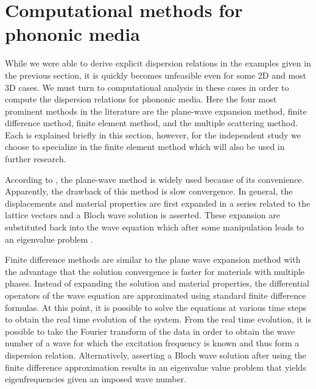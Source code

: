 \documentclass{article}
\begin{document}
\section{Computational methods for phononic media} \label{methods}
While we were able to derive explicit dispersion relations in the examples 
given in the previous section, it is quickly becomes unfeasible even for some 
2D and most 3D cases. We must turn to computational analysis in these cases in 
order to compute the dispersion relations for phononic media. Here the 
four most prominent methods in the literature are the plane-wave expansion 
method, finite difference method, finite element method, and the multiple 
scattering method. Each is explained briefly in this section, however, for the 
independent study we choose to specialize in the finite element method which 
will also be used in further research.

According to \cite{cao04}, the plane-wave method is widely used because of its 
convenience. Apparently, the drawback of this method is slow convergence. In 
general, the displacements and material properties are first expanded in a 
series related to the lattice vectors and a Bloch wave solution is asserted. 
These expansion are substituted back into the wave equation which after some 
manipulation leads to an eigenvalue problem \cite{hussein14}.

Finite difference methods are similar to the plane wave expansion method with 
the advantage that the solution convergence is faster for materials with 
multiple phases. Instead of expanding the solution and material properties, the 
differential operators of the wave equation are approximated using standard 
finite difference formulas. At this point, it is possible to solve the 
equations at various time steps to obtain the real time evolution of the 
system. From the real time evolution, it is possible to take the Fourier 
transform of the data in order to obtain the wave number of a wave for which 
the excitation frequency is known and thus form a dispersion relation. 
Alternatively, asserting a Bloch wave solution after using the finite 
difference approximation results in an eigenvalue value problem that yields 
eigenfrequencies given an imposed wave number. 
\end{document}
